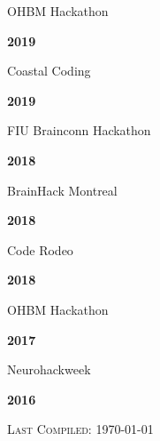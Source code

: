 \documentclass[10pt]{article}
\newenvironment{bottompar}{\par\vspace*{\fill}}{\clearpage}
\newcommand{\headstyle}{\scshape \normalsize \textcolor{light-gray}}
\begin{document}
\begin{minipage}[t]{.85\linewidth}
\flushleft
\noindent
OHBM Hackathon
\end{minipage}
\hfill
\begin{minipage}[t]{.15\linewidth}
\flushright
\noindent
\textsc{\textbf{2019}}
\end{minipage}

\begin{minipage}[t]{.85\linewidth}
\flushleft
\noindent
Coastal Coding
\end{minipage}
\hfill
\begin{minipage}[t]{.15\linewidth}
\flushright
\noindent
\textsc{\textbf{2019}}
\end{minipage}

\begin{minipage}[t]{.85\linewidth}
\flushleft
\noindent
FIU Brainconn Hackathon
\end{minipage}
\hfill
\begin{minipage}[t]{.15\linewidth}
\flushright
\noindent
\textsc{\textbf{2018}}
\end{minipage}

\begin{minipage}[t]{.85\linewidth}
\flushleft
\noindent
BrainHack Montreal
\end{minipage}
\hfill
\begin{minipage}[t]{.15\linewidth}
\flushright
\noindent
\textsc{\textbf{2018}}
\end{minipage}

\begin{minipage}[t]{.85\linewidth}
\flushleft
\noindent
Code Rodeo
\end{minipage}
\hfill
\begin{minipage}[t]{.15\linewidth}
\flushright
\noindent
\textsc{\textbf{2018}}
\end{minipage}

\begin{minipage}[t]{.85\linewidth}
\flushleft
\noindent
OHBM Hackathon
\end{minipage}
\hfill
\begin{minipage}[t]{.15\linewidth}
\flushright
\noindent
\textsc{\textbf{2017}}
\end{minipage}

\begin{minipage}[t]{.85\linewidth}
\flushleft
\noindent
Neurohackweek
\end{minipage}
\hfill
\begin{minipage}[t]{.15\linewidth}
\flushright
\noindent
\textsc{\textbf{2016}}
\end{minipage}

\begin{bottompar}
	\begin{center}
		\headstyle{Last Compiled: \today}
	\end{center}
\end{bottompar}
\end{document}
